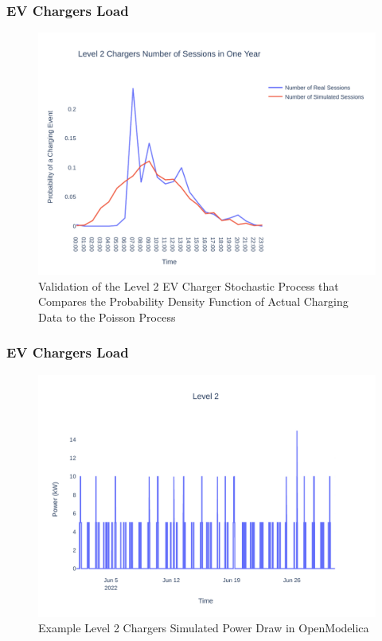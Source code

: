 \documentclass[aspectratio=169, 8 pt]{beamer}
\begin{document}
		\begin{frame}
			\frametitle{EV Chargers Load}
			\begin{figure}
				\centering
				\includegraphics[width=0.7\linewidth]{Fig/l2_avg_day_rand_poisson_1_hour_pdf}
				\caption{Validation of the Level 2 EV Charger Stochastic Process that Compares the Probability Density Function of Actual Charging Data to the Poisson Process}
				\label{fig:l2avgdayrandpoisson1hourpdf}
			\end{figure}
		\end{frame}
	
		\begin{frame}
			\frametitle{EV Chargers Load}
			\begin{figure}
				\centering
				\includegraphics[width=0.7\linewidth]{Fig/l2_g_pad_poisson_June}
				\caption{Example Level 2 Chargers Simulated Power Draw in OpenModelica}
				\label{fig:l2gpadpoissonjune}
			\end{figure}
		\end{frame}
	
%		
%			
\end{document}
